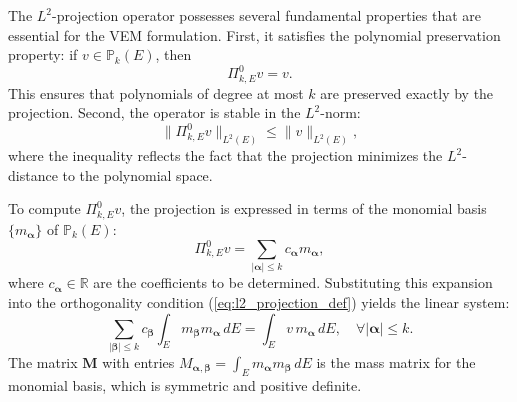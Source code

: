 \documentclass{article}
\begin{document}
The $L^2$-projection operator possesses several fundamental properties that are essential for the VEM formulation. First, it satisfies the polynomial preservation property: if $v \in \mathbb{P}_k(E)$, then
\begin{equation}\label{eq:l2_poly_preservation}
    \Pi^0_{k,E} v = v.
\end{equation}
This ensures that polynomials of degree at most $k$ are preserved exactly by the projection. Second, the operator is stable in the $L^2$-norm:
\begin{equation}\label{eq:l2_stability}
    \| \Pi^0_{k,E} v \|_{L^2(E)} \leq \| v \|_{L^2(E)},
\end{equation}
where the inequality reflects the fact that the projection minimizes the $L^2$-distance to the polynomial space.

To compute $\Pi^0_{k,E} v$, the projection is expressed in terms of the monomial basis $\{m_{\boldsymbol{\alpha}}\}$ of $\mathbb{P}_k(E)$:
\begin{equation}\label{eq:l2_expansion}
    \Pi^0_{k,E} v = \sum_{|\boldsymbol{\alpha}| \leq k} c_{\boldsymbol{\alpha}} m_{\boldsymbol{\alpha}},
\end{equation}
where $c_{\boldsymbol{\alpha}} \in \mathbb{R}$ are the coefficients to be determined. Substituting this expansion into the orthogonality condition (\ref{eq:l2_projection_def}) yields the linear system:
\begin{equation}\label{eq:l2_linear_system}
    \sum_{|\boldsymbol{\beta}| \leq k} c_{\boldsymbol{\beta}} \int_E m_{\boldsymbol{\beta}} m_{\boldsymbol{\alpha}} \, dE = \int_E v\, m_{\boldsymbol{\alpha}} \, dE, \quad \forall |\boldsymbol{\alpha}| \leq k.
\end{equation}
The matrix $\mathbf{M}$ with entries $M_{\boldsymbol{\alpha}, \boldsymbol{\beta}} = \int_E m_{\boldsymbol{\alpha}} m_{\boldsymbol{\beta}} \, dE$ is the mass matrix for the monomial basis, which is symmetric and positive definite.
\end{document}
